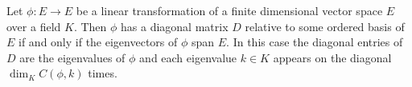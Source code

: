 Let $\phi : E \to E$ be a linear transformation of a finite dimensional vector space $E$ over a field $K$. Then $\phi$ has a diagonal matrix $D$ relative to some ordered basis of $E$ if and only if the eigenvectors of $\phi$ span $E$. In this case the diagonal entries of $D$ are the eigenvalues of $\phi$ and each eigenvalue $k \in K$ appears on the diagonal $\dim_K C(\phi, k)$ times.
